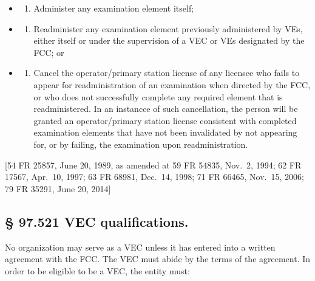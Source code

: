\documentclass[
  letterpaper,
  DIV=11,
  numbers=noendperiod]{scrreport}
\providecommand{\tightlist}{%
  \setlength{\itemsep}{0pt}\setlength{\parskip}{0pt}}\usepackage{longtable,booktabs,array}
\begin{document}
\begin{itemize}
\item
  \begin{enumerate}
  \def\labelenumi{(\arabic{enumi})}
  \tightlist
  \item
    Administer any examination element itself;
  \end{enumerate}
\item
  \begin{enumerate}
  \def\labelenumi{(\arabic{enumi})}
  \setcounter{enumi}{1}
  \tightlist
  \item
    Readminister any examination element previously administered by VEs,
    either itself or under the supervision of a VEC or VEs designated by
    the FCC; or
  \end{enumerate}
\item
  \begin{enumerate}
  \def\labelenumi{(\arabic{enumi})}
  \setcounter{enumi}{2}
  \tightlist
  \item
    Cancel the operator/primary station license of any licensee who
    fails to appear for readministration of an examination when directed
    by the FCC, or who does not successfully complete any required
    element that is readministered. In an instancce of such
    cancellation, the person will be granted an operator/primary station
    license consistent with completed examination elements that have not
    been invalidated by not appearing for, or by failing, the
    examination upon readministration.
  \end{enumerate}
\end{itemize}

{[}54 FR 25857, June 20, 1989, as amended at 59 FR 54835, Nov.~2, 1994;
62 FR 17567, Apr.~10, 1997; 63 FR 68981, Dec.~14, 1998; 71 FR 66465,
Nov.~15, 2006; 79 FR 35291, June 20, 2014{]}

\hypertarget{vec-qualifications.}{%
\subsection*{§ 97.521 VEC qualifications.}\label{vec-qualifications.}}

No organization may serve as a VEC unless it has entered into a written
agreement with the FCC. The VEC must abide by the terms of the
agreement. In order to be eligible to be a VEC, the entity must:
\end{document}
